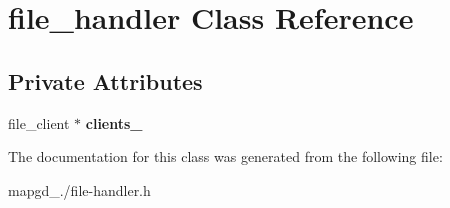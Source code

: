 \hypertarget{classfile__handler}{\section{file\-\_\-handler Class Reference}
\label{classfile__handler}
}
\subsection*{Private Attributes}
\begin{DoxyCompactItemize}
\item 
\hypertarget{classfile__handler_ab6d755b4dfd2f7b9b94cd762316feaba}{file\-\_\-client $\ast$ {\bfseries clients\-\_\-}}\label{classfile__handler_ab6d755b4dfd2f7b9b94cd762316feaba}

\end{DoxyCompactItemize}


The documentation for this class was generated from the following file\-:\begin{DoxyCompactItemize}
\item 
mapgd\-\_./file-\/handler.\-h\end{DoxyCompactItemize}
